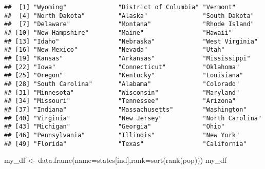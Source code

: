 \documentclass[
]{article}
\newenvironment{Shaded}{\begin{snugshade}}{\end{snugshade}}
\newcommand{\AttributeTok}[1]{\textcolor[rgb]{0.77,0.63,0.00}{#1}}
\newcommand{\FunctionTok}[1]{\textcolor[rgb]{0.00,0.00,0.00}{#1}}
\newcommand{\NormalTok}[1]{#1}
\newcommand{\OtherTok}[1]{\textcolor[rgb]{0.56,0.35,0.01}{#1}}
\begin{document}
\begin{verbatim}
##  [1] "Wyoming"              "District of Columbia" "Vermont"             
##  [4] "North Dakota"         "Alaska"               "South Dakota"        
##  [7] "Delaware"             "Montana"              "Rhode Island"        
## [10] "New Hampshire"        "Maine"                "Hawaii"              
## [13] "Idaho"                "Nebraska"             "West Virginia"       
## [16] "New Mexico"           "Nevada"               "Utah"                
## [19] "Kansas"               "Arkansas"             "Mississippi"         
## [22] "Iowa"                 "Connecticut"          "Oklahoma"            
## [25] "Oregon"               "Kentucky"             "Louisiana"           
## [28] "South Carolina"       "Alabama"              "Colorado"            
## [31] "Minnesota"            "Wisconsin"            "Maryland"            
## [34] "Missouri"             "Tennessee"            "Arizona"             
## [37] "Indiana"              "Massachusetts"        "Washington"          
## [40] "Virginia"             "New Jersey"           "North Carolina"      
## [43] "Michigan"             "Georgia"              "Ohio"                
## [46] "Pennsylvania"         "Illinois"             "New York"            
## [49] "Florida"              "Texas"                "California"
\end{verbatim}

\begin{Shaded}
\begin{Highlighting}[]
\NormalTok{my\_df }\OtherTok{\textless{}{-}} \FunctionTok{data.frame}\NormalTok{(}\AttributeTok{name=}\NormalTok{states[ind],}\AttributeTok{rank=}\FunctionTok{sort}\NormalTok{(}\FunctionTok{rank}\NormalTok{(pop)))}
\NormalTok{my\_df}
\end{Highlighting}
\end{Shaded}
\end{document}
